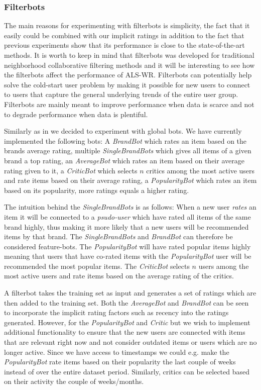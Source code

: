 \subsubsection{Filterbots}

The main reasons for experimenting with filterbots is simplicity, the fact that it easily could
be combined with our implicit ratings in addition to the fact that previous experiments \cite{Agarwal2009, Agarwal2010}
show that its performance is close to the state-of-the-art methods. It is worth to keep in mind that filterbots was
developed for traditional neighborhood collaborative filtering methods and it will be interesting to see how the filterbots affect
the performance of ALS-WR. Filterbots can potentially help solve the cold-start user problem by making it possible for
new users to connect to users that capture the general underlying trends of the entire user group. Filterbots are mainly
meant to improve performance when data is scarce and not to degrade performance when data is plentiful.

Similarly as in \cite{Park2006} we decided to experiment with global bots. We have currently implemented the
following bots: A \emph{BrandBot} which rates an item based on the brands average rating,
multiple \emph{SingleBrandBots} which gives all items of a given brand a top rating,
an \emph{AverageBot} which rates an item based on their average rating given to it, a \emph{CriticBot} which selects $n$ critics
among the most active users and rate items based on their average rating, a \emph{PopularityBot} which rates
an item based on its popularity, more ratings equals a higher rating.

The intuition behind the \emph{SingleBrandBots} is as follows: When a new user \emph{rates} an item it will be connected to
a \emph{psudo-user} which have rated all items of the same brand highly, thus making it more likely  that a new users will
be recommended items by that brand. The \emph{SingleBrandBots} and \emph{BrandBot} can therefore be considered feature-bots. The \emph{PopularityBot} will have rated popular items highly meaning that
users that have co-rated items with the \emph{PopularityBot} user will be recommended the most popular items.
The \emph{CriticBot} selects $n$ users among the most active users and rate items based on the average rating
of the critics.

A filterbot takes the training set as input and generates a set of ratings which are then added to the training set. Both the \emph{AverageBot} and \emph{BrandBot} can be seen to incorporate the implicit rating factors such as recency into the ratings generated. However, for the \emph{PopularityBot} and \emph{Critic} but we wish to implement additional functionality to ensure
that the new users are connected with items that are relevant right now and not consider outdated items or users which
are no longer active. Since we have access to timestamps we could e.g. make the \emph{PopularityBot} rate items based on
their popularity the last couple of weeks instead of over the entire dataset period. Similarly, critics can be selected
based on their activity the couple of weeks/months.



